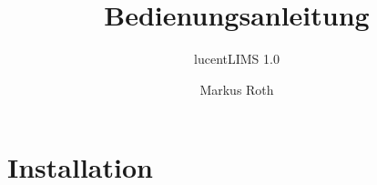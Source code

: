 \documentclass[11pt]{scrartcl} %
\title{Bedienungsanleitung}
\subtitle{lucentLIMS 1.0}
\author{Markus Roth}
\begin{document}
\maketitle

\section{Installation}


\end{document}
